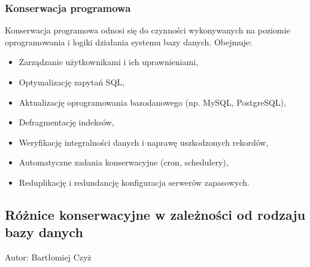 \documentclass[a4paper,11pt,openany,english]{sphinxmanual}
\begin{document}
\subsubsection{Konserwacja programowa}
\label{\detokenize{rozdzial2/Kontrola_i_konserwacja/kontrola_i_konserwacja:konserwacja-programowa}}
\sphinxAtStartPar
Konserwacja programowa odnosi się do czynności wykonywanych na poziomie oprogramowania i logiki działania systemu bazy danych. Obejmuje:
\begin{itemize}
\item {} 
\sphinxAtStartPar
Zarządzanie użytkownikami i ich uprawnieniami,

\item {} 
\sphinxAtStartPar
Optymalizację zapytań SQL,

\item {} 
\sphinxAtStartPar
Aktualizację oprogramowania bazodanowego (np. MySQL, PostgreSQL),

\item {} 
\sphinxAtStartPar
Defragmentację indeksów,

\item {} 
\sphinxAtStartPar
Weryfikację integralności danych i naprawę uszkodzonych rekordów,

\item {} 
\sphinxAtStartPar
Automatyczne zadania konserwacyjne (cron, schedulery),

\item {} 
\sphinxAtStartPar
Reduplikację i redundancję \sphinxhyphen{} konfiguracja serwerów zapasowych.

\end{itemize}


\subsection{Różnice konserwacyjne w zależności od rodzaju bazy danych}
\label{\detokenize{rozdzial2/Kontrola_i_konserwacja/kontrola_i_konserwacja:roznice-konserwacyjne-w-zaleznosci-od-rodzaju-bazy-danych}}
\sphinxAtStartPar
Autor: Bartłomiej Czyż
\end{document}
